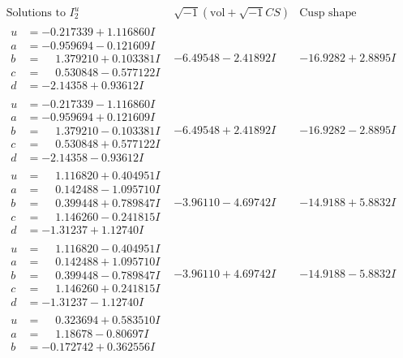 \documentclass[1p]{elsarticle_modified}
\theoremstyle{definition}
\newcommand{\I}{\sqrt{-1}}
\begin{document}
$$\begin{array}{c|c|c}  
\text{Solutions to }I^u_{2}& \I (\text{vol} + \sqrt{-1}CS) & \text{Cusp shape}\\
 \hline 
\begin{aligned}
u &= -0.217339 + 1.116860 I \\
a &= -0.959694 - 0.121609 I \\
b &= \phantom{-}1.379210 + 0.103381 I \\
c &= \phantom{-}0.530848 - 0.577122 I \\
d &= -2.14358 + 0.93612 I\end{aligned}
 & -6.49548 - 2.41892 I & -16.9282 + 2.8895 I \\ \hline\begin{aligned}
u &= -0.217339 - 1.116860 I \\
a &= -0.959694 + 0.121609 I \\
b &= \phantom{-}1.379210 - 0.103381 I \\
c &= \phantom{-}0.530848 + 0.577122 I \\
d &= -2.14358 - 0.93612 I\end{aligned}
 & -6.49548 + 2.41892 I & -16.9282 - 2.8895 I \\ \hline\begin{aligned}
u &= \phantom{-}1.116820 + 0.404951 I \\
a &= \phantom{-}0.142488 - 1.095710 I \\
b &= \phantom{-}0.399448 + 0.789847 I \\
c &= \phantom{-}1.146260 - 0.241815 I \\
d &= -1.31237 + 1.12740 I\end{aligned}
 & -3.96110 - 4.69742 I & -14.9188 + 5.8832 I \\ \hline\begin{aligned}
u &= \phantom{-}1.116820 - 0.404951 I \\
a &= \phantom{-}0.142488 + 1.095710 I \\
b &= \phantom{-}0.399448 - 0.789847 I \\
c &= \phantom{-}1.146260 + 0.241815 I \\
d &= -1.31237 - 1.12740 I\end{aligned}
 & -3.96110 + 4.69742 I & -14.9188 - 5.8832 I \\ \hline\begin{aligned}
u &= \phantom{-}0.323694 + 0.583510 I \\
a &= \phantom{-}1.18678 - 0.80697 I \\
b &= -0.172742 + 0.362556 I \\

\end{aligned}
\end{array}$$
\end{document}
